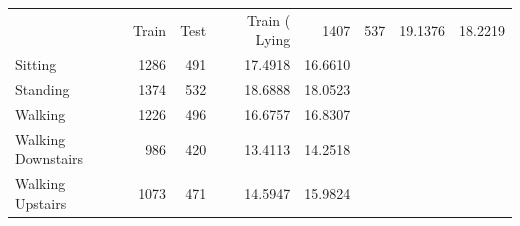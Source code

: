 \begin{tabular}{lrrrr}
\toprule
 & Train & Test & Train (%
\midrule
Lying & 1407 & 537 & 19.1376 & 18.2219 \\
Sitting & 1286 & 491 & 17.4918 & 16.6610 \\
Standing & 1374 & 532 & 18.6888 & 18.0523 \\
Walking & 1226 & 496 & 16.6757 & 16.8307 \\
Walking Downstairs & 986 & 420 & 13.4113 & 14.2518 \\
Walking Upstairs & 1073 & 471 & 14.5947 & 15.9824 \\
\bottomrule
\end{tabular}
